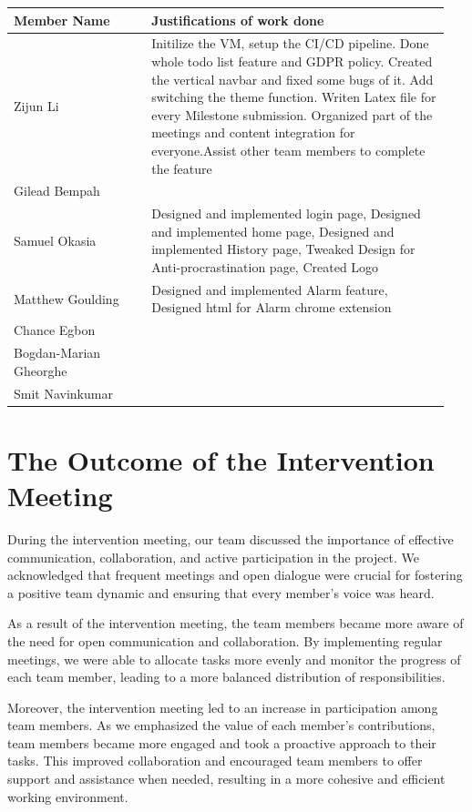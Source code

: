 \documentclass[a4paper]{article}
\begin{document}
{\noindent\begin{tabular}{|p{0.3\linewidth}|p{0.65\linewidth}|} 
	\hline
 \textbf{Member Name} & \textbf{Justifications of work done} \\
 \hline
 Zijun Li & Initilize the VM, setup the CI/CD pipeline. Done whole todo list feature and GDPR policy. Created the vertical navbar and fixed some bugs of it. Add switching the theme function. Writen Latex file for every Milestone submission. Organized part of the meetings and content integration for everyone.Assist other team members to complete the feature \\
 \hline
 Gilead Bempah & \\
 \hline
 Samuel Okasia & Designed and implemented login page, Designed and implemented home page, Designed and implemented History page, Tweaked Design for Anti-procrastination page, Created Logo\\
 \hline
 Matthew Goulding& Designed and implemented Alarm feature, Designed html for Alarm chrome extension\\
 \hline
 Chance Egbon & \\
 \hline
 Bogdan-Marian Gheorghe & \\
 \hline
 Smit Navinkumar& \\
 \hline
\end{tabular}}

\newpage

\section*{The Outcome of the Intervention Meeting}

During the intervention meeting, our team discussed the importance of effective communication, collaboration, and active participation in the project. We acknowledged that frequent meetings and open dialogue were crucial for fostering a positive team dynamic and ensuring that every member's voice was heard.

As a result of the intervention meeting, the team members became more aware of the need for open communication and collaboration. By implementing regular meetings, we were able to allocate tasks more evenly and monitor the progress of each team member, leading to a more balanced distribution of responsibilities.

Moreover, the intervention meeting led to an increase in participation among team members. As we emphasized the value of each member's contributions, team members became more engaged and took a proactive approach to their tasks. This improved collaboration and encouraged team members to offer support and assistance when needed, resulting in a more cohesive and efficient working environment.
\end{document}
